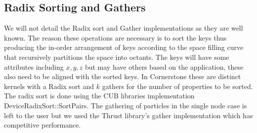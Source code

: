 \subsection{Radix Sorting and Gathers}
We will not detail the Radix sort and Gather implementations as they are well known. The reason these operations are necessary is to sort the keys thus producing the in-order arrangement of keys according to the space filling curve that recursively partitions the space into octants. The keys will have some attributes including $x,y,z$ but may have others based on the application, these also need to be aligned with the sorted keys. In Cornerstone these are distinct kernels with a Radix sort and $k$ gathers for the number of properties to be sorted. The radix sort is done using the CUB libraries implementation DeviceRadixSort::SortPairs. The gathering of particles in the single node case is left to the user but we used the Thrust library's gather implementation which has competitive performance.

